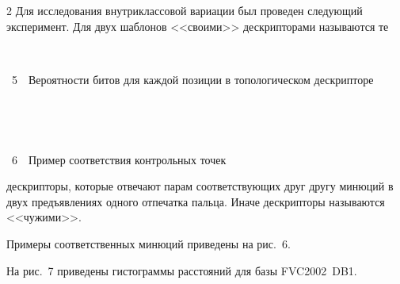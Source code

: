 \begin{multicols}{2}
      Для исследования внутриклассовой вариации был проведен следующий 
эксперимент. Для двух  шаблонов <<своими>> дескрипторами называются те\linebreak\vspace*{-12pt}
\begin{center} %
\vspace*{18pt}
\mbox{%
 \epsfxsize=65.974mm
}
\end{center}
\vspace*{3pt}
{{\figurename~5}\ \ \small{Вероятности битов для каждой позиции в топологическом дескрипторе}}


\addtocounter{figure}{2}

\begin{figure}[b] %
 \vspace*{9pt}
 \begin{center}
 \mbox{%
 \epsfxsize=163.359mm
 }
 \end{center}
 \vspace*{-9pt}
\end{figure}


\noindent
\begin{center} %
\vspace*{1pt}
\mbox{%
 \epsfxsize=78.512mm
}
\end{center}
\begin{center}
\vspace*{9pt}
{{\figurename~6}\ \ \small{Пример соответствия контрольных точек}}
\end{center}

\vspace*{6pt}


\noindent
 дескрипторы, которые отвечают парам соответствующих друг другу минюций в двух 
предъявлениях одного отпечатка пальца. Иначе дескрипторы называются <<чужими>>. 

Примеры соответственных минюций приведены на рис.~6. 

На рис.~7 приведены 
гистограммы расстояний для базы FVC2002~DB1.



\end{multicols}
